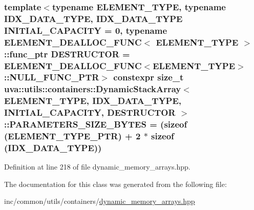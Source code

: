 \subsubsection[{P\+A\+R\+A\+M\+E\+T\+E\+R\+S\+\_\+\+S\+I\+Z\+E\+\_\+\+B\+Y\+T\+E\+S}]{\setlength{\rightskip}{0pt plus 5cm}template$<$typename E\+L\+E\+M\+E\+N\+T\+\_\+\+T\+Y\+P\+E, typename I\+D\+X\+\_\+\+D\+A\+T\+A\+\_\+\+T\+Y\+P\+E, I\+D\+X\+\_\+\+D\+A\+T\+A\+\_\+\+T\+Y\+P\+E I\+N\+I\+T\+I\+A\+L\+\_\+\+C\+A\+P\+A\+C\+I\+T\+Y = 0, typename E\+L\+E\+M\+E\+N\+T\+\_\+\+D\+E\+A\+L\+L\+O\+C\+\_\+\+F\+U\+N\+C$<$ E\+L\+E\+M\+E\+N\+T\+\_\+\+T\+Y\+P\+E $>$\+::func\+\_\+ptr D\+E\+S\+T\+R\+U\+C\+T\+O\+R = E\+L\+E\+M\+E\+N\+T\+\_\+\+D\+E\+A\+L\+L\+O\+C\+\_\+\+F\+U\+N\+C$<$\+E\+L\+E\+M\+E\+N\+T\+\_\+\+T\+Y\+P\+E$>$\+::\+N\+U\+L\+L\+\_\+\+F\+U\+N\+C\+\_\+\+P\+T\+R$>$ constexpr size\+\_\+t {\bf uva\+::utils\+::containers\+::\+Dynamic\+Stack\+Array}$<$ E\+L\+E\+M\+E\+N\+T\+\_\+\+T\+Y\+P\+E, I\+D\+X\+\_\+\+D\+A\+T\+A\+\_\+\+T\+Y\+P\+E, I\+N\+I\+T\+I\+A\+L\+\_\+\+C\+A\+P\+A\+C\+I\+T\+Y, D\+E\+S\+T\+R\+U\+C\+T\+O\+R $>$\+::P\+A\+R\+A\+M\+E\+T\+E\+R\+S\+\_\+\+S\+I\+Z\+E\+\_\+\+B\+Y\+T\+E\+S = (sizeof ({\bf E\+L\+E\+M\+E\+N\+T\+\_\+\+T\+Y\+P\+E\+\_\+\+P\+T\+R}) + 2 $\ast$ sizeof (I\+D\+X\+\_\+\+D\+A\+T\+A\+\_\+\+T\+Y\+P\+E))\hspace{0.3cm}{\ttfamily [static]}}\label{classuva_1_1utils_1_1containers_1_1_dynamic_stack_array_ac85d2e6df8da903b64bab0a26cbf38ee}


Definition at line 218 of file dynamic\+\_\+memory\+\_\+arrays.\+hpp.



The documentation for this class was generated from the following file\+:\begin{DoxyCompactItemize}
\item 
inc/common/utils/containers/\hyperlink{dynamic__memory__arrays_8hpp}{dynamic\+\_\+memory\+\_\+arrays.\+hpp}\end{DoxyCompactItemize}
